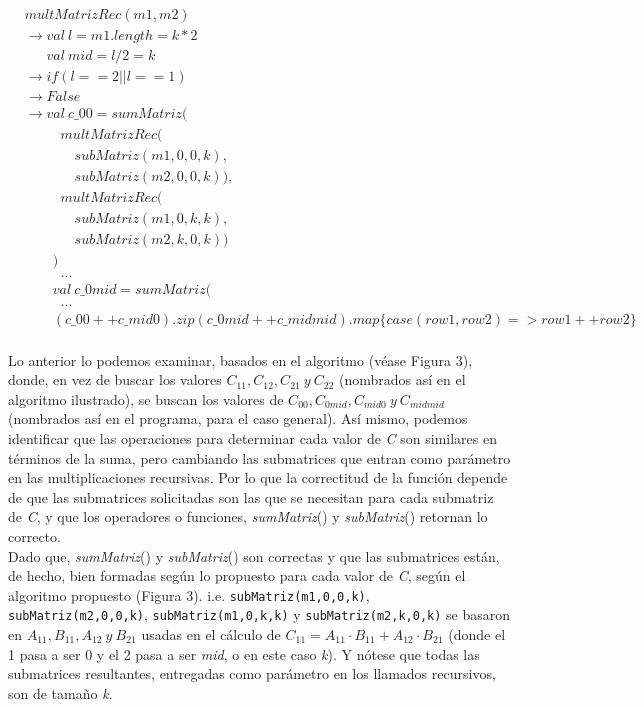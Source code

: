 \documentclass{article}
\begin{document}
\begin{align*}
    &multMatrizRec(m1, m2)\\
    &\rightarrow val \ l = m1.length = k*2\\
    &\quad \; \; val \ mid = l/2 = k\\
    &\rightarrow if (l == 2 || l == 1)\\
    &\rightarrow False\\
    &\rightarrow val \ c\_00 = sumMatriz(\\
    &\quad \quad \; \;    multMatrizRec(\\
    &\quad \quad \quad \; \;      subMatriz(m1, 0, 0, k),\\
    &\quad \quad \quad \; \;      subMatriz(m2, 0, 0, k)),\\
    &\quad \quad \; \;    multMatrizRec(\\
    &\quad \quad \quad \; \;      subMatriz(m1, 0, k, k),\\
    &\quad \quad \quad \; \;      subMatriz(m2, k, 0, k))\\
    &\quad \quad  )\\
    &\quad \quad \; \; . . .\\
    &\quad \quad  val \ c\_0mid = sumMatriz(\\
    &\quad \quad \; \; . . .\\
    &\quad \quad  (c\_00 ++ c\_mid0).zip(c\_0mid ++ c\_midmid).map \{case (row1, row2) => row1 ++ row2\}\\
\end{align*}

Lo anterior lo podemos examinar, basados en el algoritmo (véase Figura 3), donde, en vez de buscar los valores \(C_{11}, C_{12}, C_{21} \ y \  C_{22}\) (nombrados así en el algoritmo ilustrado), se buscan los valores de \(C_{00}, C_{0mid}, C_{mid0} \ y \ C_{midmid}\) (nombrados así en el programa, para el caso general). Así mismo, podemos identificar que las operaciones para determinar cada valor de \textit{C} son similares en términos de la suma, pero cambiando las submatrices que entran como parámetro en las multiplicaciones recursivas. Por lo que la correctitud de la función depende de que las submatrices solicitadas son las que se necesitan para cada submatriz de \textit{C}, y que los operadores o funciones, \textit{sumMatriz}() y \textit{subMatriz}() retornan lo correcto. \\

Dado que, \textit{sumMatriz}() y \textit{subMatriz}() son correctas y que las submatrices están, de hecho, bien formadas según lo propuesto para cada valor de \textit{C}, según el algoritmo propuesto (Figura 3). i.e. \verb|subMatriz(m1,0,0,k)|, \verb|subMatriz(m2,0,0,k)|, \verb|subMatriz(m1,0,k,k)| y \verb|subMatriz(m2,k,0,k)| se basaron en \(A_{11}, B_{11}, A_{12} \ y \ B_{21}\) usadas en el cálculo de \(C_{11} = A_{11} \cdot B_{11} + A_{12} \cdot B_{21}\) (donde el 1 pasa a ser 0 y el 2 pasa a ser \textit{mid}, o en este caso \textit{k}). Y nótese que todas las submatrices resultantes, entregadas como parámetro en los llamados recursivos, son de tamaño \textit{k}.\\
\end{document}
